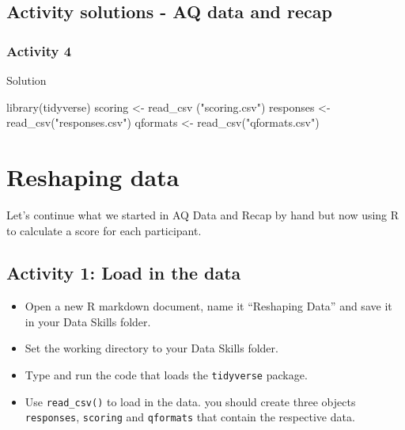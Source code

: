 \documentclass[
  oneside]{book}
\newenvironment{Shaded}{\begin{snugshade}}{\end{snugshade}}
\newcommand{\FunctionTok}[1]{\textcolor[rgb]{0.00,0.00,0.00}{#1}}
\newcommand{\NormalTok}[1]{#1}
\newcommand{\OtherTok}[1]{\textcolor[rgb]{0.56,0.35,0.01}{#1}}
\newcommand{\StringTok}[1]{\textcolor[rgb]{0.31,0.60,0.02}{#1}}
\providecommand{\tightlist}{%
  \setlength{\itemsep}{0pt}\setlength{\parskip}{0pt}}
\begin{document}
\hypertarget{activity-solutions---aq-data-and-recap}{%
\section{Activity solutions - AQ data and recap}\label{activity-solutions---aq-data-and-recap}}

\hypertarget{activity-4-1}{%
\subsection{Activity 4}\label{activity-4-1}}

Solution

\begin{Shaded}
\begin{Highlighting}[]
\FunctionTok{library}\NormalTok{(tidyverse)}
\NormalTok{scoring }\OtherTok{\textless{}{-}} \FunctionTok{read\_csv}\NormalTok{ (}\StringTok{"scoring.csv"}\NormalTok{)}
\NormalTok{responses }\OtherTok{\textless{}{-}} \FunctionTok{read\_csv}\NormalTok{(}\StringTok{"responses.csv"}\NormalTok{)}
\NormalTok{qformats }\OtherTok{\textless{}{-}} \FunctionTok{read\_csv}\NormalTok{(}\StringTok{"qformats.csv"}\NormalTok{)}
\end{Highlighting}
\end{Shaded}

\hypertarget{reshaping-data}{%
\chapter{Reshaping data}\label{reshaping-data}}

Let's continue what we started in AQ Data and Recap by hand but now using R to calculate a score for each participant.

\hypertarget{activity-1-load-in-the-data}{%
\section{Activity 1: Load in the data}\label{activity-1-load-in-the-data}}

\begin{itemize}
\tightlist
\item
  Open a new R markdown document, name it ``Reshaping Data'' and save it in your Data Skills folder.
\item
  Set the working directory to your Data Skills folder.
\item
  Type and run the code that loads the \texttt{tidyverse} package.
\item
  Use \texttt{read\_csv()} to load in the data. you should create three objects \texttt{responses}, \texttt{scoring} and \texttt{qformats} that contain the respective data.
\end{itemize}
\end{document}
